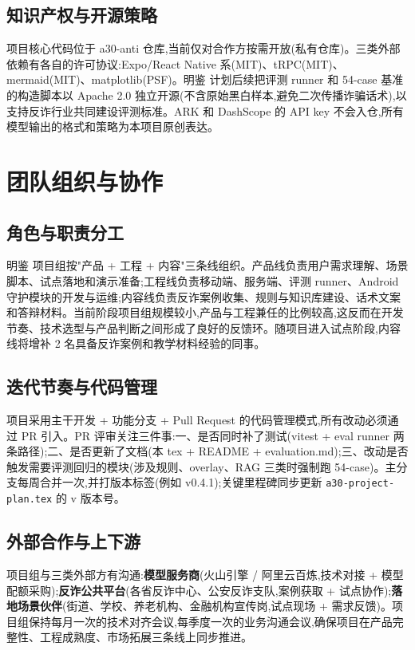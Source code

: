 \documentclass[UTF8,a4paper,12pt]{ctexart}
\begin{document}
\subsection{知识产权与开源策略}

项目核心代码位于 a30-anti 仓库,当前仅对合作方按需开放(私有仓库)。三类外部依赖有各自的许可协议:Expo/React Native 系(MIT)、tRPC(MIT)、mermaid(MIT)、matplotlib(PSF)。明鉴 计划后续把评测 runner 和 54-case 基准的构造脚本以 Apache 2.0 独立开源(不含原始黑白样本,避免二次传播诈骗话术),以支持反诈行业共同建设评测标准。ARK 和 DashScope 的 API key 不会入仓,所有模型输出的格式和策略为本项目原创表达。

\section{团队组织与协作}

\subsection{角色与职责分工}

明鉴 项目组按"产品 + 工程 + 内容"三条线组织。产品线负责用户需求理解、场景脚本、试点落地和演示准备;工程线负责移动端、服务端、评测 runner、Android 守护模块的开发与运维;内容线负责反诈案例收集、规则与知识库建设、话术文案和答辩材料。当前阶段项目组规模较小,产品与工程兼任的比例较高,这反而在开发节奏、技术选型与产品判断之间形成了良好的反馈环。随项目进入试点阶段,内容线将增补 2 名具备反诈案例和教学材料经验的同事。

\subsection{迭代节奏与代码管理}

项目采用主干开发 + 功能分支 + Pull Request 的代码管理模式,所有改动必须通过 PR 引入。PR 评审关注三件事:一、是否同时补了测试(vitest + eval runner 两条路径);二、是否更新了文档(本 tex + README + evaluation.md);三、改动是否触发需要评测回归的模块(涉及规则、overlay、RAG 三类时强制跑 54-case)。主分支每周合并一次,并打版本标签(例如 v0.4.1);关键里程碑同步更新 \texttt{a30-project-plan.tex} 的 v 版本号。

\subsection{外部合作与上下游}

项目组与三类外部方有沟通:\textbf{模型服务商}(火山引擎 / 阿里云百炼,技术对接 + 模型配额采购);\textbf{反诈公共平台}(各省反诈中心、公安反诈支队,案例获取 + 试点协作);\textbf{落地场景伙伴}(街道、学校、养老机构、金融机构宣传岗,试点现场 + 需求反馈)。项目组保持每月一次的技术对齐会议,每季度一次的业务沟通会议,确保项目在产品完整性、工程成熟度、市场拓展三条线上同步推进。
\end{document}
